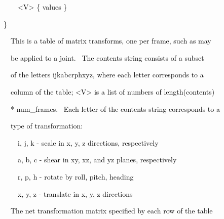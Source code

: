 \documentclass[a4paper]{article}
\newcommand\textstyleOOoComputerKeyWord[1]{\textrm{\textcolor[rgb]{0.0,0.0,0.5019608}{#1}}}
\newcommand\textstyleOOoAssemblerSpecialChar[1]{\textrm{\textcolor[rgb]{0.0,0.5019608,0.0}{#1}}}
\newcommand\textstyleOOoAssemblerIdent[1]{\textrm{\textcolor{black}{#1}}}
\begin{document}
{\color{black}
\textstyleOOoComputerKeyWord{\textcolor{black}{\ \ \ \ \ \ }}\textstyleOOoAssemblerSpecialChar{{\textless}}\textstyleOOoAssemblerIdent{V}\textstyleOOoAssemblerSpecialChar{{\textgreater}}\textstyleOOoComputerKeyWord{\textcolor{black}{
}}\textstyleOOoAssemblerSpecialChar{\{}\textstyleOOoComputerKeyWord{\textcolor{black}{
}}\textstyleOOoAssemblerIdent{values}\textstyleOOoComputerKeyWord{\textcolor{black}{
}}\textstyleOOoAssemblerSpecialChar{\}}}

{\color{black}
\textstyleOOoComputerKeyWord{\textcolor{black}{\ \ }}\textstyleOOoAssemblerSpecialChar{\}}}


\bigskip

{\color{black}
\textstyleOOoComputerKeyWord{\textcolor{black}{\ \ \ \ This is a table of matrix transforms, one per frame, such as
may}}}

{\color{black}
\textstyleOOoComputerKeyWord{\textcolor{black}{\ \ \ \ be applied to a joint. \ The
{\textquotedbl}contents{\textquotedbl} string consists of a subset}}}

{\color{black}
\textstyleOOoComputerKeyWord{\textcolor{black}{\ \ \ \ of the letters {\textquotedbl}ijkabcrphxyz{\textquotedbl}, where
each letter corresponds to a}}}

{\color{black}
\textstyleOOoComputerKeyWord{\textcolor{black}{\ \ \ \ column of the table; {\textless}V{\textgreater} is a list of
numbers of length(contents)}}}

{\color{black}
\textstyleOOoComputerKeyWord{\textcolor{black}{\ \ \ \ * num\_frames. \ Each letter of the contents string corresponds
to a}}}

{\color{black}
\textstyleOOoComputerKeyWord{\textcolor{black}{\ \ \ \ type of transformation:}}}


\bigskip

{\color{black}
\textstyleOOoComputerKeyWord{\textcolor{black}{\ \ \ \ \ \ i, j, k - scale in x, y, z directions, respectively}}}

{\color{black}
\textstyleOOoComputerKeyWord{\textcolor{black}{\ \ \ \ \ \ a, b, c - shear in xy, xz, and yz planes, respectively}}}

{\color{black}
\textstyleOOoComputerKeyWord{\textcolor{black}{\ \ \ \ \ \ r, p, h - rotate by roll, pitch, heading}}}

{\color{black}
\textstyleOOoComputerKeyWord{\textcolor{black}{\ \ \ \ \ \ x, y, z - translate in x, y, z directions}}}


\bigskip

{\color{black}
\textstyleOOoComputerKeyWord{\textcolor{black}{\ \ \ \ The net transformation matrix specified by each row of the
table}}}
\end{document}
